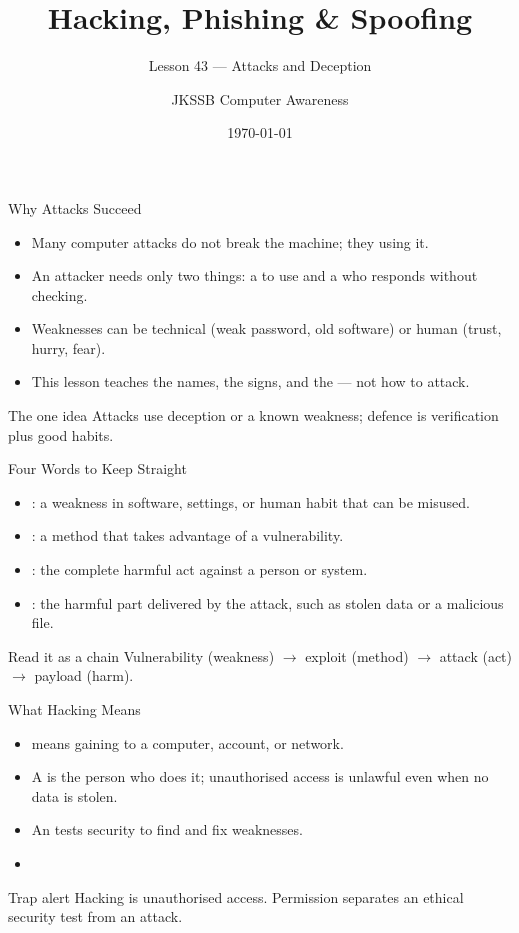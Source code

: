 \documentclass[aspectratio=169]{beamer}
\title{Hacking, Phishing \& Spoofing}
\subtitle{Lesson 43 --- Attacks and Deception}
\author{JKSSB Computer Awareness}
\date{\today}
\begin{document}
\frame{\titlepage}

\begin{frame}{Why Attacks Succeed}
  \begin{itemize}
    \item Many computer attacks do not break the machine; they
       using it.
    \item An attacker needs only two things: a  to use and
      a  who responds without checking.
    \item Weaknesses can be technical (weak password, old software) or
      human (trust, hurry, fear).
    \item This lesson teaches the names, the signs, and the
       --- not how to attack.
  \end{itemize}
  \begin{block}{The one idea}
    Attacks use deception or a known weakness; defence is verification
    plus good habits.
  \end{block}
\end{frame}

\begin{frame}{Four Words to Keep Straight}
  \begin{itemize}
    \item {}: a weakness in software, settings, or
      human habit that can be misused.
    \item {}: a method that takes advantage of a
      vulnerability.
    \item {}: the complete harmful act against a person or
      system.
    \item {}: the harmful part delivered by the attack, such
      as stolen data or a malicious file.
  \end{itemize}
  \begin{block}{Read it as a chain}
    Vulnerability (weakness) $\rightarrow$ exploit (method)
    $\rightarrow$ attack (act) $\rightarrow$ payload (harm).
  \end{block}
\end{frame}

\begin{frame}{What Hacking Means}
  \begin{itemize}
    \item {} means gaining  to a
      computer, account, or network.
    \item A  is the person who does it; unauthorised access
      is unlawful even when no data is stolen.
    \item An  tests security  to find and fix weaknesses.
    \item {}
  \end{itemize}
  \begin{alertblock}{Trap alert}
    Hacking is unauthorised access. Permission separates an ethical
    security test from an attack.
  \end{alertblock}
\end{frame}
\end{document}

